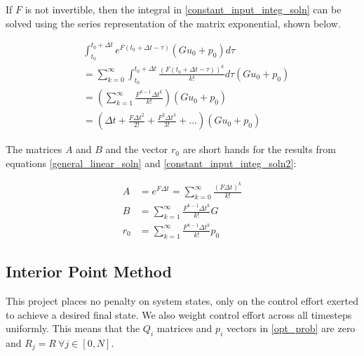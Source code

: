 \documentclass{exam}
\begin{document}
\begin{multicols*}{2}
If $F$ is not invertible, then the integral in \eqref{constant_input_integ_soln} can be solved using the series representation of the matrix exponential, shown below.

\begin{equation}
\begin{aligned}
    \label{constant_input_integ_soln2}
    &\int_{t_0}^{t_0 + \Delta t} e^{F(t_0 + \Delta t -\tau)} (G u_0 + p_0) d\tau \\
    &= \sum_{k=0}^\infty \int_{t_0}^{t_0 + \Delta t} \frac{(F(t_0 + \Delta t -\tau))^k}{k!} d \tau (G u_0 + p_0)\\
    &= \left( \sum_{k=1}^\infty \frac{F^{k-1} \Delta t^{k}}{k!} \right) (G u_0 + p_0) \\
    &= \left( \Delta t + \frac{F \Delta t^2}{2!} + \frac{F^2 \Delta t^3}{3!} + ... \right) (G u_0 + p_0)
\end{aligned}
\end{equation}

The matrices $A$ and $B$ and the vector $r_0$ are short hands for the results from equations \eqref{general_linear_soln} and \eqref{constant_input_integ_soln2}:

\begin{equation}
    \begin{aligned}
        A &= e^{F \Delta t} = \sum_{k=0}^\infty \frac{(F \Delta t)^{k}}{k!} \\
        B &= \sum_{k=1}^\infty \frac{F^{k-1} \Delta t^{k}}{k!} G \\
        r_0 &= \sum_{k=1}^\infty \frac{F^{k-1} \Delta t^{k}}{k!} p_0
    \end{aligned}
\end{equation}

\subsection{Interior Point Method}

This project places no penalty on system states, only on the control effort exerted to achieve a desired final state. We also weight control effort across all timesteps uniformly. This means that the $Q_i$ matrices and $p_i$ vectors in \eqref{opt_prob} are zero and $R_j = R ~\forall j \in [0, N]$.


\end{multicols*}
\end{document}
